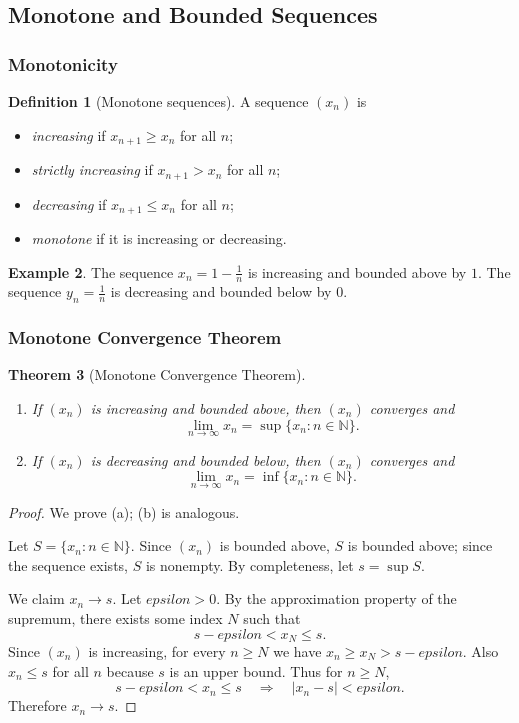 \documentclass[12pt]{article}
\numberwithin{equation}{section}
\def\abs#1{|#1|}
\def\eps{epsilon}
\newcommand{\NN}{\mathbb{N}}
\DeclarePairedDelimiter{\abs}{\lvert}{\rvert}
\newcommand{\eps}{\varepsilon}               %
\theoremstyle{plain}
\newtheorem{theorem}{Theorem}[section]
\theoremstyle{definition}
\newtheorem{definition}[theorem]{Definition}
\newtheorem{example}[theorem]{Example}
\theoremstyle{remark}
\begin{document}
\subsection{Monotone and Bounded Sequences}

\subsubsection{Monotonicity}

\begin{definition}[Monotone sequences]
A sequence $(x_n)$ is
\begin{itemize}
\item \emph{increasing} if $x_{n+1}\ge x_n$ for all $n$;
\item \emph{strictly increasing} if $x_{n+1}>x_n$ for all $n$;
\item \emph{decreasing} if $x_{n+1}\le x_n$ for all $n$;
\item \emph{monotone} if it is increasing or decreasing.
\end{itemize}
\end{definition}

\begin{example}
The sequence $x_n=1-\frac{1}{n}$ is increasing and bounded above by $1$.
The sequence $y_n=\frac{1}{n}$ is decreasing and bounded below by $0$.
\end{example}

\subsubsection{Monotone Convergence Theorem}

\begin{theorem}[Monotone Convergence Theorem]\label{thm:monotone-convergence}
\begin{enumerate}[label=(\alph*)]
\item If $(x_n)$ is increasing and bounded above, then $(x_n)$ converges and
\[
\lim_{n\to\infty} x_n = \sup\{x_n:n\in\NN\}.
\]
\item If $(x_n)$ is decreasing and bounded below, then $(x_n)$ converges and
\[
\lim_{n\to\infty} x_n = \inf\{x_n:n\in\NN\}.
\]
\end{enumerate}
\end{theorem}

\begin{proof}
We prove (a); (b) is analogous.

Let $S=\{x_n:n\in\NN\}$. Since $(x_n)$ is bounded above, $S$ is bounded above; since the sequence exists, $S$ is nonempty.
By completeness, let $s=\sup S$.

We claim $x_n\to s$. Let $\eps>0$.
By the approximation property of the supremum, there exists some index $N$ such that
\[
s-\eps < x_N \le s.
\]
Since $(x_n)$ is increasing, for every $n\ge N$ we have $x_n\ge x_N> s-\eps$.
Also $x_n\le s$ for all $n$ because $s$ is an upper bound.
Thus for $n\ge N$,
\[
s-\eps < x_n \le s \quad \Rightarrow\quad \abs{x_n-s}<\eps.
\]
Therefore $x_n\to s$.
\end{proof}
\end{document}
